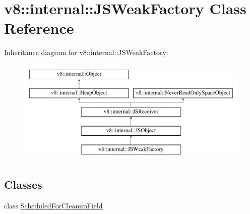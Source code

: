 \hypertarget{classv8_1_1internal_1_1JSWeakFactory}{}\section{v8\+:\+:internal\+:\+:J\+S\+Weak\+Factory Class Reference}
\label{classv8_1_1internal_1_1JSWeakFactory}
Inheritance diagram for v8\+:\+:internal\+:\+:J\+S\+Weak\+Factory\+:\begin{figure}[H]
\begin{center}
\leavevmode
\includegraphics[height=5.000000cm]{classv8_1_1internal_1_1JSWeakFactory}
\end{center}
\end{figure}
\subsection*{Classes}
\begin{DoxyCompactItemize}
\item 
class \mbox{\hyperlink{classv8_1_1internal_1_1JSWeakFactory_1_1ScheduledForCleanupField}{Scheduled\+For\+Cleanup\+Field}}
\end{DoxyCompactItemize}
